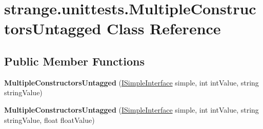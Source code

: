 \hypertarget{classstrange_1_1unittests_1_1_multiple_constructors_untagged}{\section{strange.\-unittests.\-Multiple\-Constructors\-Untagged Class Reference}
\label{classstrange_1_1unittests_1_1_multiple_constructors_untagged}
}
\subsection*{Public Member Functions}
\begin{DoxyCompactItemize}
\item 
\hypertarget{classstrange_1_1unittests_1_1_multiple_constructors_untagged_aa8b85e4d8772f6434522369ce25d5172}{{\bfseries Multiple\-Constructors\-Untagged} (\hyperlink{interfacestrange_1_1unittests_1_1_i_simple_interface}{I\-Simple\-Interface} simple, int int\-Value, string string\-Value)}\label{classstrange_1_1unittests_1_1_multiple_constructors_untagged_aa8b85e4d8772f6434522369ce25d5172}

\item 
\hypertarget{classstrange_1_1unittests_1_1_multiple_constructors_untagged_a73b53208bcf040789dfbadfab1f99760}{{\bfseries Multiple\-Constructors\-Untagged} (\hyperlink{interfacestrange_1_1unittests_1_1_i_simple_interface}{I\-Simple\-Interface} simple, int int\-Value, string string\-Value, float float\-Value)}\label{classstrange_1_1unittests_1_1_multiple_constructors_untagged_a73b53208bcf040789dfbadfab1f99760}

\end{DoxyCompactItemize}
